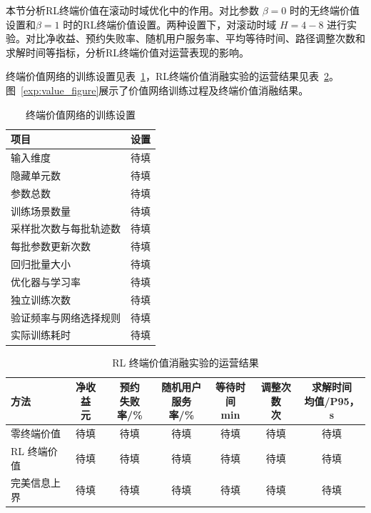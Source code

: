 本节分析RL终端价值在滚动时域优化中的作用。对比参数 $\beta=0$ 时的无终端价值设置和$\beta=1$ 时的RL终端价值设置。两种设置下，对滚动时域 $H=4-8$ 进行实验。对比净收益、预约失败率、随机用户服务率、平均等待时间、路径调整次数和求解时间等指标，分析RL终端价值对运营表现的影响。

终端价值网络的训练设置见表~\ref{exp:training}，RL终端价值消融实验的运营结果见表~\ref{exp:value_results}。图~\ref{exp:value_figure}展示了价值网络训练过程及终端价值消融结果。

\begin{table}[!htbp]
  \centering
  \caption{终端价值网络的训练设置}
  \label{exp:training}
  \small
  \begin{tabularx}{\linewidth}{@{}Xc@{}}
    \toprule
    项目 & 设置 \\
    \midrule
    输入维度 & 待填 \\
    隐藏单元数 & 待填 \\
    参数总数 & 待填 \\
    训练场景数量 & 待填 \\
    采样批次数与每批轨迹数 & 待填 \\
    每批参数更新次数 & 待填 \\
    回归批量大小 & 待填 \\
    优化器与学习率 & 待填 \\
    独立训练次数 & 待填 \\
    验证频率与网络选择规则 & 待填 \\
    实际训练耗时 & 待填 \\
    \bottomrule
  \end{tabularx}
\end{table}

\begin{table}[!htbp]
  \centering
  \caption{RL 终端价值消融实验的运营结果}
  \label{exp:value_results}
  \small
  \setlength{\tabcolsep}{3pt}
  \begin{tabularx}{\linewidth}{@{}Xcccccc@{}}
    \toprule
    方法 & \shortstack{净收益\\元} & \shortstack{预约\\失败率/\%} & \shortstack{随机用户\\服务率/\%} & \shortstack{等待时间\\min} & \shortstack{调整次数\\次} & \shortstack{求解时间\\均值/P95，s} \\
    \midrule
    零终端价值 & 待填 & 待填 & 待填 & 待填 & 待填 & 待填 \\
    RL 终端价值 & 待填 & 待填 & 待填 & 待填 & 待填 & 待填 \\
    完美信息上界 & 待填 & 待填 & 待填 & 待填 & 待填 & 待填 \\
    \bottomrule
  \end{tabularx}
\end{table}

